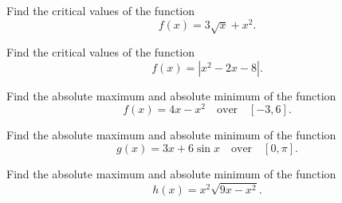 \begin{exercise}

Find the critical values of the function \[f(x)=3\sqrt{x}+x^2.\]

\end{exercise}
\vspace*{6\baselineskip}

\begin{exercise}

Find the critical values of the function \[f(x)=|x^2-2x-8|.\]

\end{exercise}
\vspace*{6\baselineskip}

\begin{exercise}

Find the absolute maximum and absolute minimum of the function
\[f(x)=4x-x^2\quad\text{over}\quad [-3,6].\]

\end{exercise}
\vspace*{6\baselineskip}

\begin{exercise}

Find the absolute maximum and absolute minimum of the function
\[g(x)=3x+6\sin x \quad\text{over}\quad [0,\pi].\]

\end{exercise}
\vspace*{6\baselineskip}

\begin{exercise}

Find the absolute maximum and absolute minimum of the function
\[h(x)=x^2\sqrt{9x-x^2}.\]

\end{exercise}

